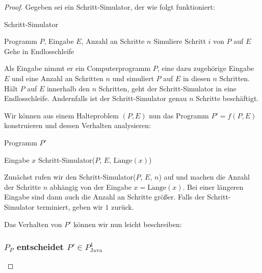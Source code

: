 \documentclass[journal]{IEEEtran}
\begin{document}
\begin{proof}
Gegeben sei ein Schritt-Simulator, der wie folgt funktioniert:

\begin{algorithm}
\caption{Schritt-Simulator}
\begin{algorithmic}[1]
\renewcommand{\algorithmicrequire}{\textbf{Input:}}
\renewcommand{\algorithmicensure}{\textbf{Output:}}
\REQUIRE Programm $P$, Eingabe $E$, Anzahl an Schritte $n$
  \STATE Simuliere Schritt $i$ von $P$ auf $E$
   \STATE Gehe in Endlosschleife
  \ENDIF
 \ENDFOR
\end{algorithmic}
\end{algorithm}

Als Eingabe nimmt er ein Computerprogramm $P$, eine dazu zugehörige Eingabe $E$ und eine Anzahl an Schritten $n$ und simuliert $P$ auf $E$ in diesen $n$ Schritten. Hält $P$ auf $E$ innerhalb den $n$ Schritten, geht der Schritt-Simulator in eine Endlosschleife. Andernfalls ist der Schritt-Simulator genau $n$ Schritte beschäftigt.

Wir können aus einem Halteproblem $(P, E)$ nun das Programm $P' = f(P, E)$ konstruieren und dessen Verhalten analysieren:

\begin{algorithm}
\caption{Programm $P'$}
\begin{algorithmic}[1]
\renewcommand{\algorithmicrequire}{\textbf{Input:}}
\renewcommand{\algorithmicensure}{\textbf{Output:}}
\REQUIRE Eingabe $x$
\STATE Schritt-Simulator($P$, $E$, $\operatorname{L\ddot{a}nge}(x)$)
\end{algorithmic}
\end{algorithm}

Zunächst rufen wir den Schritt-Simulator($P$, $E$, $n$) auf und machen die Anzahl der Schritte $n$ abhängig von der Eingabe $x = \operatorname{L\ddot{a}nge}(x)$. Bei einer längeren Eingabe sind dann auch die Anzahl an Schritte größer. Falls der Schritt-Simulator terminiert, geben wir $1$ zurück.

Das Verhalten von $P'$ können wir nun leicht beschreiben:

\subsubsection{$P_P$ entscheidet $P' \in P_\text{Java}^1$}


\end{proof}
\end{document}
